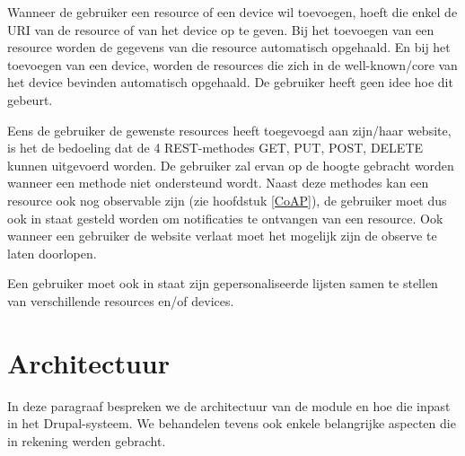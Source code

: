 Wanneer de gebruiker een resource of een device wil toevoegen, hoeft die enkel de URI van de resource of van het device op te geven. Bij het toevoegen van een resource worden de gegevens van die resource automatisch opgehaald. En bij het toevoegen van een device, worden de resources die zich in de well-known/core van het device bevinden automatisch opgehaald. De gebruiker heeft geen idee hoe dit gebeurt.

Eens de gebruiker de gewenste resources heeft toegevoegd aan zijn/haar website, is het de bedoeling dat de 4 REST-methodes GET, PUT, POST, DELETE kunnen uitgevoerd worden. De gebruiker zal ervan op de hoogte gebracht worden wanneer een methode niet ondersteund wordt. Naast deze methodes kan een resource ook nog observable zijn (zie hoofdstuk \ref{CoAP}), de gebruiker moet dus ook in staat gesteld worden om notificaties te ontvangen van een resource. Ook wanneer een gebruiker de website verlaat moet het mogelijk zijn de observe te laten doorlopen.

Een gebruiker moet ook in staat zijn gepersonaliseerde lijsten samen te stellen van verschillende resources en/of devices.

\section{Architectuur}
In deze paragraaf bespreken we de architectuur van de module en hoe die inpast in het Drupal-systeem. We behandelen tevens ook enkele belangrijke aspecten die in rekening werden gebracht. %

